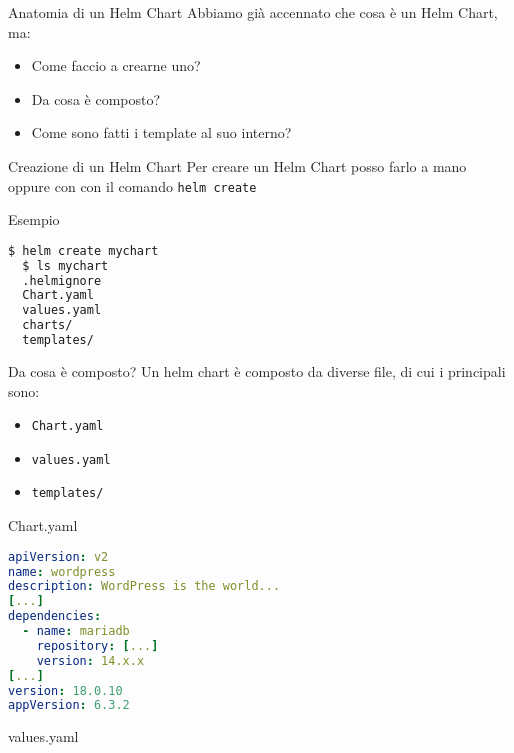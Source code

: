 \documentclass{beamer}
\begin{document}
 \begin{frame}{Anatomia di un Helm Chart}
  Abbiamo già accennato che cosa è un Helm Chart, ma: 
  \begin{itemize}
      \item Come faccio a crearne uno?
      \item Da cosa è composto?
      \item Come sono fatti i template al suo interno?
  \end{itemize}
  \framebreak
  \begin{block}{Creazione di un Helm Chart}
  Per creare un Helm Chart posso farlo a mano oppure con con il comando \lstinline[language=bash]{helm create} 
  \end{block}
  \framebreak
  \begin{block}{Esempio}
  \begin{lstlisting}[backgroundcolor=\color{white},language=bash,basicstyle=\small]
  $ helm create mychart
  $ ls mychart
  .helmignore
  Chart.yaml
  values.yaml
  charts/
  templates/
  \end{lstlisting}
  \end{block}
  \framebreak
  \begin{block}{Da cosa è composto?}
  Un helm chart è composto da diverse file, di cui i principali sono:
  \begin{itemize}
      \item \lstinline[language=bash]{Chart.yaml}
      \item \lstinline[language=bash]{values.yaml}
      \item \lstinline[language=bash]{templates/}
  \end{itemize}
  \end{block}
  \framebreak
  \begin{block}{Chart.yaml}
  \begin{lstlisting}[backgroundcolor=\color{white},language=yaml,basicstyle=\small]
apiVersion: v2
name: wordpress
description: WordPress is the world...
[...]
dependencies:
  - name: mariadb
    repository: [...]
    version: 14.x.x
[...]
version: 18.0.10
appVersion: 6.3.2
  \end{lstlisting}
  \end{block}
  \framebreak
  \begin{block}{values.yaml}
  \begin{lstlisting}[backgroundcolor=\color{white},language=yaml,basicstyle=\tiny]
  

\end{lstlisting}
\end{block}
\end{frame}
\end{document}
